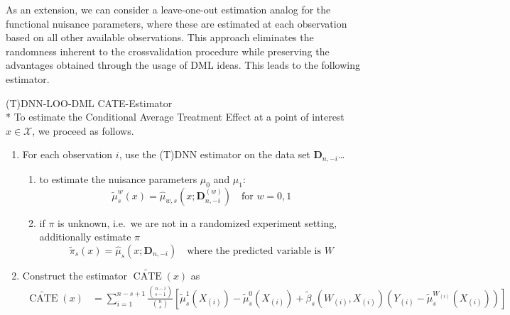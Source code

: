 As an extension, we can consider a leave-one-out estimation analog for the functional nuisance parameters, where these are estimated at each observation based on all other available observations.
This approach eliminates the randomness inherent to the crossvalidation procedure while preserving the advantages obtained through the usage of DML ideas.
This leads to the following estimator.
\begin{boxD}
	\begin{dfn}{(T)DNN-LOO-DML CATE-Estimator}\label{def:CATE_DNN_LOO_DML}\mbox{}\\*
		To estimate the Conditional Average Treatment Effect at a point of interest $x \in \mathcal{X}$, we proceed as follows.
		\begin{enumerate}
			\item For each observation $i$, use the (T)DNN estimator on the data set $\mathbf{D}_{n,-i}$\dots
			      \begin{enumerate}
				      \item to estimate the nuisance parameters $\mu_0$ and $\mu_1$:
				            \begin{equation}
					            \tilde{\mu}_{s}^{w}\left(x\right) 
								= \hat{\mu}_{w,s}\left(x; \mathbf{D}_{n,-i}^{(w)}\right) \quad \text{for } w=0,1
				            \end{equation}
				      \item if $\pi$ is unknown, i.e.\ we are not in a randomized experiment setting,
				            additionally estimate $\pi$
				            \begin{equation}
					            \tilde{\pi}_{s}\left(x\right) 
								= \hat{\mu}_{s}\left(x; \mathbf{D}_{n,-i}\right) \quad \text{where the predicted variable is $W$}
				            \end{equation}
			      \end{enumerate}
			\item Construct the estimator $\widetilde{\operatorname{CATE}}\left(x\right)$ as
			      \begin{equation}
					\begin{aligned}
						\widetilde{\operatorname{CATE}}\left(x\right) & = \sum_{i = 1}^{n - s + 1} \frac{\binom{n-i}{s-1}}{\binom{n}{s}}
						\left[\tilde{\mu}_{s}^{1}\left(X_{(i)}\right) - \tilde{\mu}_{s}^{0}\left(X_{(i)}\right) + \tilde{\beta}_{s}\left(W_{(i)}, X_{(i)}\right)\left(Y_{(i)} - \tilde{\mu}^{W_{(i)}}_{s}\left(X_{(i)}\right)\right)\right]
					\end{aligned}
				\end{equation}
		\end{enumerate}
	\end{dfn}
\end{boxD}